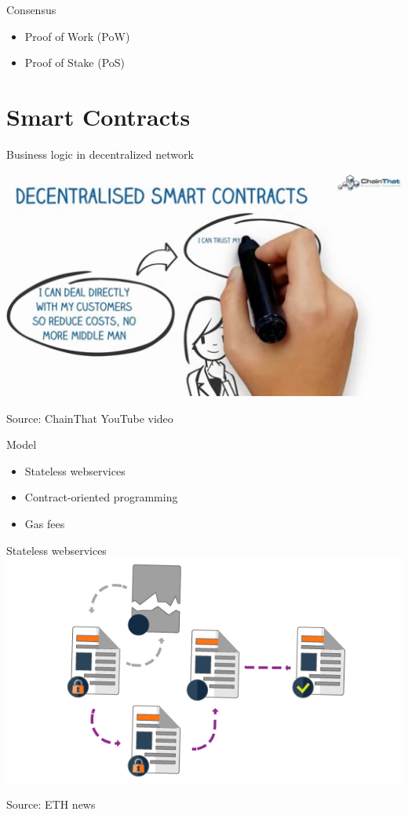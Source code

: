 \documentclass[presentation]{beamer}
\begin{document}
\begin{frame}[label=sec-1-5]{Consensus}
\begin{itemize}
\item Proof of Work (\alert{PoW})
\end{itemize}
\begin{itemize}
\item Proof of Stake (\alert{PoS})
\end{itemize}
\end{frame}

\section{Smart Contracts}
\label{sec-2}

\begin{frame}[label=sec-2-1]{Business logic in decentralized network}

\includegraphics[width=.9\linewidth]{../images/smartcontract.jpg}

Source: ChainThat YouTube video
\end{frame}

\begin{frame}[label=sec-2-2]{Model}
\begin{itemize}
\item Stateless webservices
\item Contract-oriented programming
\item Gas fees
\end{itemize}
\end{frame}

\begin{frame}[label=sec-2-3]{Stateless webservices}
\includegraphics[width=.9\linewidth]{../images/smartcontracteth.png}

Source: ETH news
\end{frame}
\end{document}
